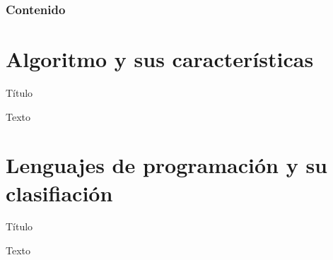 \begin{frame}
    \frametitle{Contenido}
    \tableofcontents
\end{frame}

\section{Algoritmo y sus características}

\begin{frame}[c]{Título}
    \begin{center}
        Texto
    \end{center}
\end{frame}

\section{Lenguajes de programación y su clasifiación}

\begin{frame}[c]{Título}
    \begin{center}
        Texto
    \end{center}
\end{frame}

